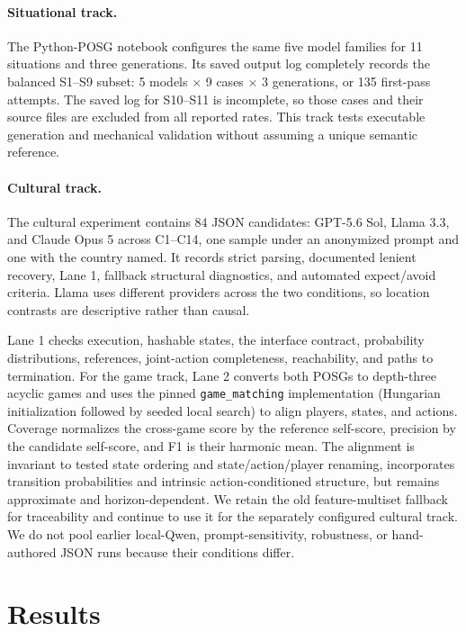 \documentclass{article}
\begin{document}
\paragraph{Situational track.} The Python-POSG notebook configures the same five model families for 11 situations and three generations. Its saved output log completely records the balanced S1--S9 subset: 5 models $\times$ 9 cases $\times$ 3 generations, or 135 first-pass attempts. The saved log for S10--S11 is incomplete, so those cases and their source files are excluded from all reported rates. This track tests executable generation and mechanical validation without assuming a unique semantic reference.

\paragraph{Cultural track.} The cultural experiment contains 84 JSON candidates: GPT-5.6 Sol, Llama 3.3, and Claude Opus 5 across C1--C14, one sample under an anonymized prompt and one with the country named. It records strict parsing, documented lenient recovery, Lane 1, fallback structural diagnostics, and automated expect/avoid criteria. Llama uses different providers across the two conditions, so location contrasts are descriptive rather than causal.

Lane 1 checks execution, hashable states, the interface contract, probability distributions, references, joint-action completeness, reachability, and paths to termination. For the game track, Lane 2 converts both POSGs to depth-three acyclic games and uses the pinned \texttt{game\_matching} implementation (Hungarian initialization followed by seeded local search) to align players, states, and actions. Coverage normalizes the cross-game score by the reference self-score, precision by the candidate self-score, and F1 is their harmonic mean. The alignment is invariant to tested state ordering and state/action/player renaming, incorporates transition probabilities and intrinsic action-conditioned structure, but remains approximate and horizon-dependent. We retain the old feature-multiset fallback for traceability and continue to use it for the separately configured cultural track. We do not pool earlier local-Qwen, prompt-sensitivity, robustness, or hand-authored JSON runs because their conditions differ.

\section{Results}
\label{sec:results}
\end{document}
